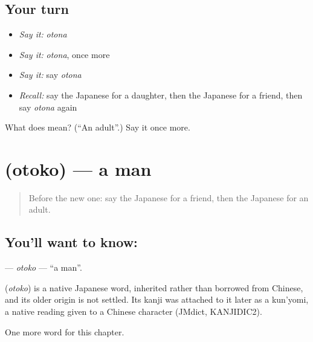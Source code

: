 \subsection*{Your turn}
\begin{itemize}
\raggedright
  \item \emph{Say it:} \emph{otona}
  \item \emph{Say it:} \emph{otona}, once more
  \item \emph{Say it:} say \emph{otona}
  \item \emph{Recall:} say the Japanese for a daughter, then the Japanese for a friend, then say \emph{otona} again
\end{itemize}

\begin{tcolorbox}[breakable,colback=teal!4,colframe=teal!35!black,title={Before you move on}]
What does  mean? (\textquotedblleft{}An adult\textquotedblright{}.) Say it once more.
\end{tcolorbox}
\section[\texorpdfstring{\ja{おとこ} (otoko)}{おとこ (otoko)}]{ (otoko) — a man}

\label{lesson:JA-C25-otoko}



\begin{quote}
Before the new one: say the Japanese for a friend, then the Japanese for an adult.
\end{quote}

\subsection*{You'll want to know: }
\textbf{} — \emph{otoko} — \textquotedblleft{}a man\textquotedblright{}.

\begin{cousinweb}
\textbf{} (\emph{otoko}) is a native Japanese word, inherited rather than borrowed from Chinese, and its older origin is not settled. Its kanji was attached to it later as a kun'yomi, a native reading given to a Chinese character (JMdict, KANJIDIC2).
\end{cousinweb}

\begin{grammarlens}[title={What you've built}]
One more word for this chapter.
\end{grammarlens}

